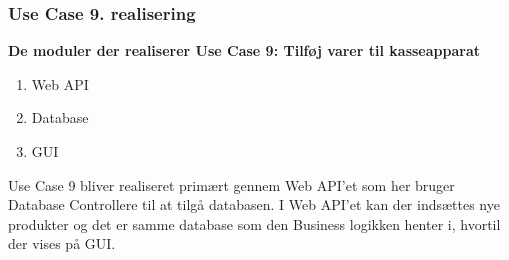 \subsubsection{Use Case 9. realisering}
\textbf{De moduler der realiserer Use Case 9: Tilføj varer til kasseapparat}

\begin{enumerate}
	\item Web API
	\item Database
	\item GUI
\end{enumerate}

Use Case 9 bliver realiseret primært gennem Web API'et som her bruger Database Controllere til at tilgå databasen. I Web API'et kan der indsættes nye produkter og det er samme database som den Business logikken henter i, hvortil der vises på GUI.
